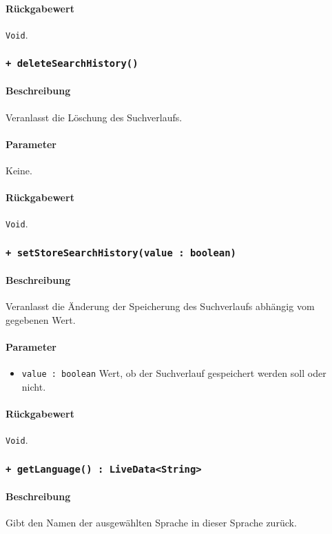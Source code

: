 \paragraph*{Rückgabewert}
\texttt{Void}.

\subsubsection*{\texttt{+ deleteSearchHistory()}}%
\paragraph*{Beschreibung}
Veranlasst die Löschung des Suchverlaufs.
\paragraph*{Parameter}
Keine.
\paragraph*{Rückgabewert}
\texttt{Void}.

\subsubsection*{\texttt{+ setStoreSearchHistory(value : boolean)}}%
\paragraph*{Beschreibung}
Veranlasst die Änderung der Speicherung des Suchverlaufs abhängig vom gegebenen Wert.
\paragraph*{Parameter}
\begin{itemize}
    \item \texttt{value : boolean} Wert, ob der Suchverlauf gespeichert werden soll oder nicht.
\end{itemize}
\paragraph*{Rückgabewert}
\texttt{Void}.

\subsubsection*{\texttt{+ getLanguage() : LiveData<String>}}%
\paragraph*{Beschreibung}
Gibt den Namen der ausgewählten Sprache in dieser Sprache zurück.
